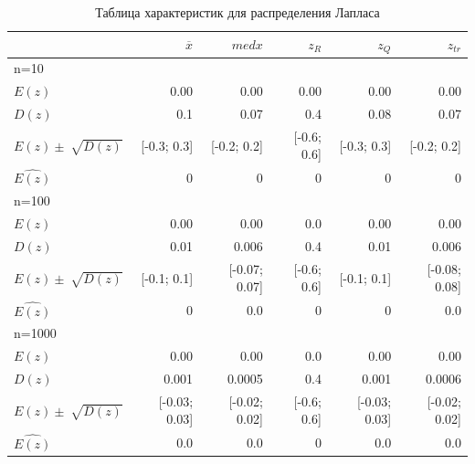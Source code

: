 \documentclass[a4paper,14pt]{article}
\begin{document}
	\begin{table}[H]
		\centering
		\begin{tabular}[t]{|l|r|r|r|r|r|}
			\hline
			& $\overline{x}$ & $med x$ & $z_R$ & $z_Q$ & $z_{tr}$\\\hline\hline
			n=10 & & & & &\\\hline
			$E(z)$ & 0.00 & 0.00 & 0.00 & 0.00 & 0.00\\\hline
			$D(z)$ & 0.1 & 0.07 & 0.4 & 0.08 & 0.07\\\hline
			$E(z)\pm\sqrt[]{D(z)}$ & [-0.3; 0.3] & [-0.2; 0.2] & [-0.6; 0.6] & [-0.3; 0.3] & [-0.2; 0.2] \\\hline
			$\hat{E(z)}$ & 0 & 0 & 0 & 0 & 0\\\hline
			n=100 & & & & &\\\hline
			$E(z)$ & 0.00 & 0.00 & 0.0 & 0.00 &  0.00\\\hline
			$D(z)$ & 0.01 & 0.006 & 0.4 & 0.01 & 0.006\\\hline
			$E(z)\pm\sqrt[]{D(z)}$ & [-0.1; 0.1] & [-0.07; 0.07] & [-0.6; 0.6] & [-0.1; 0.1] & [-0.08; 0.08]\\\hline
			$\hat{E(z)}$ & 0 & 0.0 & 0 & 0 &  0.0\\\hline
			n=1000 & & & & &\\\hline
			$E(z)$ & 0.00 & 0.00 & 0.0 & 0.00 & 0.00\\\hline
			$D(z)$ & 0.001 & 0.0005 & 0.4 & 0.001 & 0.0006\\\hline
			$E(z)\pm\sqrt[]{D(z)}$ & [-0.03; 0.03]& [-0.02; 0.02] & [-0.6; 0.6] & [-0.03; 0.03] & [-0.02; 0.02] \\\hline
			$\hat{E(z)}$ & 0.0 & 0.0 & 0 & 0.0 &  0.0\\\hline
		\end{tabular}
		\caption{Таблица характеристик для распределения Лапласа}
		\label{tab:laplace}
	\end{table}
	
\end{document}
